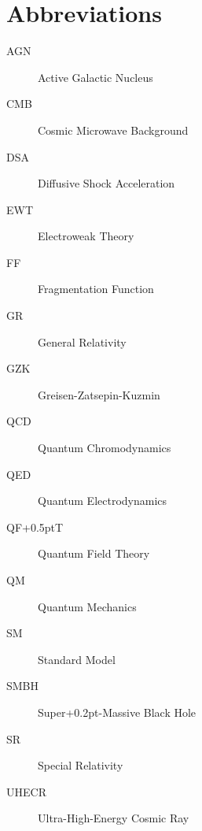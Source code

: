 \chapter*{Abbreviations}
\label{ch:abbreviations}

\begin{description}
	\item[AGN] Active Galactic Nucleus
	\item[CMB] Cosmic Microwave Background
	\item[DSA] Diffusive Shock Acceleration
	\item[EWT] Electroweak Theory
	\item[FF] Fragmentation Function
	\item[GR] General Relativity
	\item[GZK] Greisen-Zatsepin-Kuzmin
	\item[QCD] Quantum Chromodynamics
	\item[QED] Quantum Electrodynamics
	\item[QF{\kern+0.5pt}T] Quantum Field Theory
	\item[QM] Quantum Mechanics
	\item[SM] Standard Model
	\item[SMBH] Super{\kern+0.2pt}-Massive Black Hole
	\item[SR] Special Relativity
	\item[UHECR] Ultra-High-Energy Cosmic Ray
\end{description}

